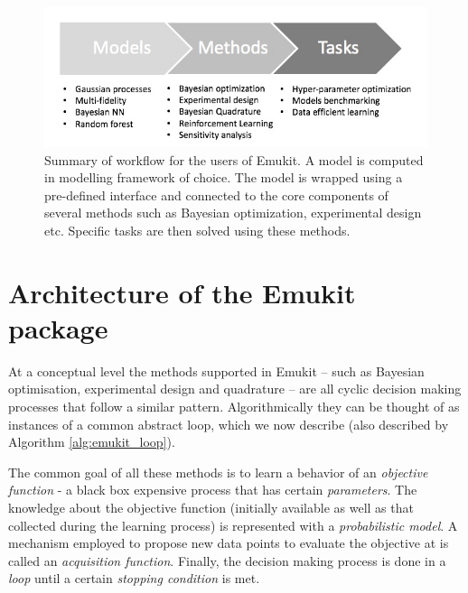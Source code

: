 \begin{figure}[h]
    \centering
      \includegraphics[scale=0.4]{workflow.png}  
    \caption{Summary of workflow for the users of Emukit. A model is computed in modelling framework of choice. The model is wrapped using a pre-defined interface and connected to the core components of several methods such as Bayesian optimization, experimental design etc. Specific tasks are then solved using these methods.}
    \label{figure:workflow}
\end{figure}

\section{Architecture of the Emukit package}

At a conceptual level the methods supported in Emukit -- such as Bayesian optimisation, experimental design and quadrature -- are all cyclic decision making processes that follow a similar pattern. 
Algorithmically they can be thought of as instances of a common abstract loop, which we now describe (also described by Algorithm \ref{alg:emukit_loop}).

The common goal of all these methods is to learn a behavior of an \textit{objective function} - a black box expensive process that has certain \textit{parameters}. The knowledge about the objective function (initially available as well as that collected during the learning process) is represented with a \textit{probabilistic model}. A mechanism employed to propose new data points to evaluate the objective at is called an \textit{acquisition function}. Finally, the decision making process is done in a \textit{loop} until a certain \textit{stopping condition} is met. 

